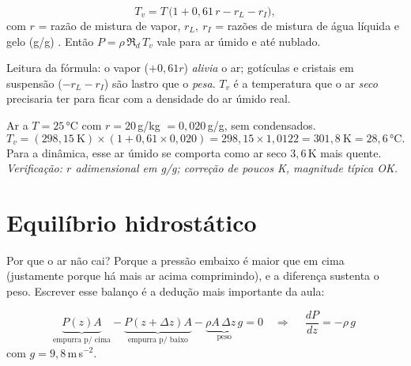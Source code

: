 \documentclass[11pt]{article}
\begin{document}
\begin{formalivro}[Stull eq.~1.21]
\[ T_v = T\,\bigl(1 + 0{,}61\, r - r_L - r_I\bigr), \]
com $r$ = razão de mistura de vapor, $r_L,\ r_I$ = razões de mistura de água
líquida e gelo (g/g) . Então
$P=\rho\,\Re_d\,T_v$ vale para ar úmido e até nublado.
\end{formalivro}

Leitura da fórmula: o vapor ($+0{,}61r$) \emph{alivia} o ar; gotículas e
cristais em suspensão ($-r_L-r_I$) são lastro que o \emph{pesa}. $T_v$ é a
temperatura que o ar \emph{seco} precisaria ter para ficar com a densidade do
ar úmido real.


\begin{exemplo}
Ar a $T=25\,°$C com $r=20$\,g/kg $=0{,}020$\,g/g, sem condensados.
\[ T_v = (298{,}15\ \mathrm{K})\times(1+0{,}61\times0{,}020)
       = 298{,}15\times1{,}0122 = 301{,}8\ \mathrm{K} = 28{,}6\,°\mathrm{C}. \]
Para a dinâmica, esse ar úmido se comporta como ar seco $3{,}6$\,K mais
quente. \emph{Verificação: $r$ adimensional em g/g; correção de poucos K,
magnitude típica OK.}
\end{exemplo}

\section{Equilíbrio hidrostático}\label{sec:hidro}


Por que o ar não cai? Porque a pressão embaixo é maior que em cima
(justamente porque há mais ar acima comprimindo), e a diferença sustenta o
peso. Escrever esse balanço é a dedução mais importante da aula:

\begin{formadif}
\[ \underbrace{P(z)A}_{\text{empurra p/ cima}}
 - \underbrace{P(z+\Delta z)A}_{\text{empurra p/ baixo}}
 - \underbrace{\rho A\,\Delta z\, g}_{\text{peso}} = 0
\quad\Longrightarrow\quad
\boxed{\ \frac{dP}{dz} = -\rho\, g\ } \]
com $g=9{,}8$\,m\,s$^{-2}$.
\end{formadif}
\end{document}
